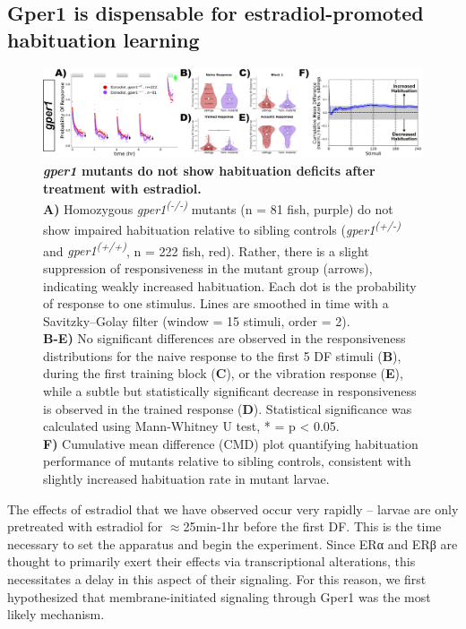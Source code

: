 \documentclass[9.5pt,lineno]{RandlettLab_elife}
\begin{document}
{\subsection{Gper1 is dispensable for estradiol-promoted habituation learning}

\begin{figure}
\begin{fullwidth}
\begin{center}
\includegraphics[width=0.8\linewidth]{figures/gper1Mutants.png}
\caption{\textbf{\emph{gper1} mutants do not show habituation deficits after treatment with estradiol.} \scriptsize
\\ \textbf{A)} Homozygous \emph{gper1\textsuperscript{(-/-)}} mutants (n = 81 fish, purple) do not show impaired habituation relative to sibling controls (\emph{gper1\textsuperscript{(+/-)}} and \emph{gper1\textsuperscript{(+/+)}}, n = 222 fish, red). Rather, there is a slight suppression of responsiveness in the mutant group (arrows), indicating weakly increased habituation. Each dot is the probability of response to one stimulus. Lines are smoothed in time with a Savitzky–Golay filter (window = 15 stimuli, order = 2).
\\ \textbf{B-E)} No significant differences are observed in the responsiveness distributions for the naive response to the first 5 DF stimuli (\textbf{B}), during the first training block (\textbf{C}), or the vibration response (\textbf{E}), while a subtle but statistically significant decrease in responsiveness is observed in the trained response (\textbf{D}). Statistical significance was calculated using Mann-Whitney U test, * = p < 0.05.
\\ \textbf{F)} Cumulative mean difference (CMD) plot quantifying habituation performance of mutants relative to sibling controls, consistent with slightly increased habituation rate in mutant larvae. 
}
\label{fig:2}

\end{center}
\end{fullwidth}
\end{figure}

The effects of estradiol that we have observed occur very rapidly -- larvae are only pretreated with estradiol for $\approx$25min-1hr before the first DF. 
This is the time necessary to set the apparatus and begin the experiment.
Since ERα and ERβ are thought to primarily exert their effects via transcriptional alterations, this necessitates a delay in this aspect of their signaling.
For this reason, we first hypothesized that membrane-initiated signaling through Gper1 was the most likely mechanism. 

}
\end{document}
